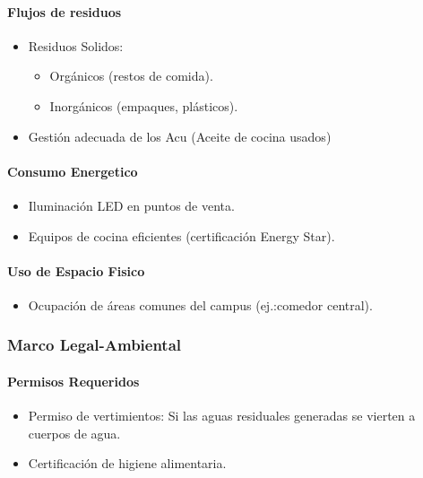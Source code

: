 \documentclass[letterpaper, 11pt]{report}
\begin{document}
\paragraph{Flujos de residuos}
\begin{itemize}
      \item Residuos Solidos:
            \begin{itemize}
                  \item Orgánicos (restos de comida). 
                  \item Inorgánicos (empaques, plásticos). 
            \end{itemize}
      \item Gestión adecuada de los Acu (Aceite de cocina usados) 
\end{itemize}

\paragraph{Consumo Energetico}
\begin{itemize}
      \item Iluminación LED en puntos de venta. 
      \item Equipos de cocina eficientes (certificación Energy Star). 
\end{itemize}

\paragraph{Uso de Espacio Fisico}
\begin{itemize}
      \item Ocupación de áreas comunes del campus (ej.:\@{}comedor central). 
\end{itemize}

\subsubsection{Marco Legal-Ambiental}

\paragraph{Permisos Requeridos}
\begin{itemize}
      \item Permiso de vertimientos: Si las aguas residuales generadas se vierten a cuerpos de agua.
      \item Certificación de higiene alimentaria.
\end{itemize}
\end{document}
